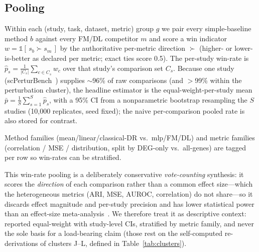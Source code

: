 \documentclass[11pt]{article}
\begin{document}
\subsection{Pooling}
Within each (study, task, dataset, metric) group $g$ we pair every simple-baseline method $b$ against every FM/DL competitor $m$ and score a win indicator $w=\mathbb{1}[\,s_b \succ s_m\,]$ by the authoritative per-metric direction $\succ$ (higher- or lower-is-better as declared per metric; exact ties score 0.5). The per-study win-rate is $\hat p_s = \frac{1}{|C_s|}\sum_{c\in C_s} w_c$ over that study's comparison set $C_s$. Because one study (scPerturBench~\cite{scperturbench2025}) supplies ${\sim}$96\% of raw comparisons (and $>$99\% within the perturbation cluster), the headline estimator is the equal-weight-per-study mean $\bar p = \frac{1}{S}\sum_{s=1}^{S}\hat p_s$, with a 95\% CI from a nonparametric bootstrap resampling the $S$ studies (10{,}000 replicates, seed fixed); the naive per-comparison pooled rate is also stored for contrast.

Method families (mean/linear/classical-DR vs.\ mlp/FM/DL) and metric families (correlation / MSE / distribution, split by DEG-only vs.\ all-genes) are tagged per row so win-rates can be stratified.

This win-rate pooling is a deliberately conservative \emph{vote-counting} synthesis: it scores the \emph{direction} of each comparison rather than a common effect size---which the heterogeneous metrics (ARI, MSE, AUROC, correlation) do not share---so it discards effect magnitude and per-study precision and has lower statistical power than an effect-size meta-analysis~\cite{borenstein2009}. We therefore treat it as descriptive context: reported equal-weight with study-level CIs, stratified by metric family, and never the sole basis for a load-bearing claim (those rest on the self-computed re-derivations of clusters J--L, defined in Table~\ref{tab:clusters}).
\end{document}
